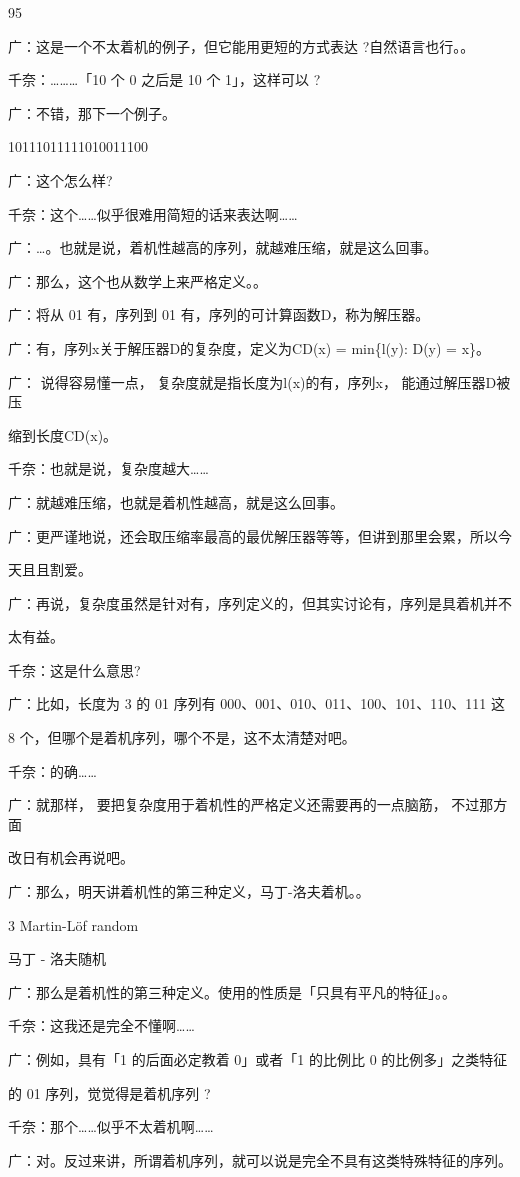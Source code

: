 95\par
广：这是一个不太着机的例子，但它能用更短的方式表达 ?自然语言也行。。\par
千奈：………「10 个 0 之后是 10 个 1」，这样可以 ?\par
广：不错，那下一个例子。\par
10111011111010011100\par
广：这个怎么样?\par
千奈：这个……似乎很难用简短的话来表达啊……\par
广：…。也就是说，着机性越高的序列，就越难压缩，就是这么回事。\par
广：那么，这个也从数学上来严格定义。。\par
广：将从 01 有，序列到 01 有，序列的可计算函数D，称为解压器。\par
广：有，序列x关于解压器D的复杂度，定义为CD(x) = min\{l(y): D(y) = x\}。\par
广： 说得容易懂一点， 复杂度就是指长度为l(x)的有，序列x， 能通过解压器D被压\par
缩到长度CD(x)。\par
千奈：也就是说，复杂度越大……\par
广：就越难压缩，也就是着机性越高，就是这么回事。\par
广：更严谨地说，还会取压缩率最高的最优解压器等等，但讲到那里会累，所以今\par
天且且割爱。\par
广：再说，复杂度虽然是针对有，序列定义的，但其实讨论有，序列是具着机并不\par
太有益。\par
千奈：这是什么意思?\par
广：比如，长度为 3 的 01 序列有 000、001、010、011、100、101、110、111 这\par
8 个，但哪个是着机序列，哪个不是，这不太清楚对吧。\par
千奈：的确……\par
广：就那样， 要把复杂度用于着机性的严格定义还需要再的一点脑筋， 不过那方面\par
改日有机会再说吧。\par
广：那么，明天讲着机性的第三种定义，马丁-洛夫着机。。\par
3 Martin-Löf random\par
马丁 - 洛夫随机\par
广：那么是着机性的第三种定义。使用的性质是「只具有平凡的特征」。。\par
千奈：这我还是完全不懂啊……\par
广：例如，具有「1 的后面必定教着 0」或者「1 的比例比 0 的比例多」之类特征\par
的 01 序列，觉觉得是着机序列 ?\par
千奈：那个……似乎不太着机啊……\par
广：对。反过来讲，所谓着机序列，就可以说是完全不具有这类特殊特征的序列。\par

